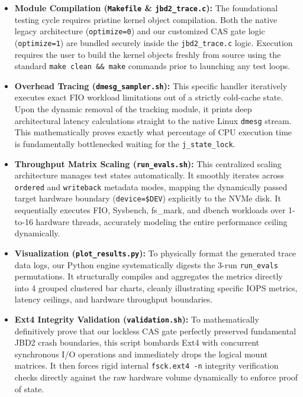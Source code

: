 \begin{itemize}
    \item \textbf{Module Compilation (\texttt{Makefile} \& \texttt{jbd2\_trace.c}):} The foundational testing cycle requires pristine kernel object compilation. Both the native legacy architecture (\texttt{optimize=0}) and our customized CAS gate logic (\texttt{optimize=1}) are bundled securely inside the \texttt{jbd2\_trace.c} logic. Execution requires the user to build the kernel objects freshly from source using the standard \texttt{make clean \&\& make} commands prior to launching any test loops.
    
    \item \textbf{Overhead Tracing (\texttt{dmesg\_sampler.sh}):} This specific handler iteratively executes exact FIO workload limitations out of a strictly cold-cache state. Upon the dynamic removal of the tracking module, it prints deep architectural latency calculations straight to the native Linux \texttt{dmesg} stream. This mathematically proves exactly what percentage of CPU execution time is fundamentally bottlenecked waiting for the \texttt{j\_state\_lock}.
    
    \item \textbf{Throughput Matrix Scaling (\texttt{run\_evals.sh}):} This centralized scaling architecture manages test states automatically. It smoothly iterates across \texttt{ordered} and \texttt{writeback} metadata modes, mapping the dynamically passed target hardware boundary (\texttt{device=\$DEV}) explicitly to the NVMe disk. It sequentially executes FIO, Sysbench, fs\_mark, and dbench workloads over 1-to-16 hardware threads, accurately modeling the entire performance ceiling dynamically.
    
    \item \textbf{Visualization (\texttt{plot\_results.py}):} To physically format the generated trace data logs, our Python engine systematically digests the 3-run \texttt{run\_evals} permutations. It structurally compiles and aggregates the metrics directly into 4 grouped clustered bar charts, cleanly illustrating specific IOPS metrics, latency ceilings, and hardware throughput boundaries.
    
    \item \textbf{Ext4 Integrity Validation (\texttt{validation.sh}):} To mathematically definitively prove that our lockless CAS gate perfectly preserved fundamental JBD2 crash boundaries, this script bombards Ext4 with concurrent synchronous I/O operations and immediately drops the logical mount matrices. It then forces rigid internal \texttt{fsck.ext4 -n} integrity verification checks directly against the raw hardware volume dynamically to enforce proof of state.


\end{itemize}
